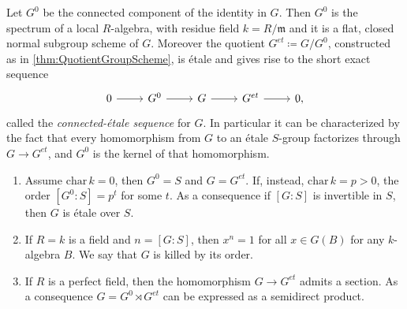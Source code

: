 \documentclass[../Main]{subfiles}
\begin{document}
\begin{thm}
	Let $G^0$ be the connected component of the identity in $G$.
	Then $G^0$ is the spectrum of a local $R$-algebra, with residue field $k = R/\mathfrak{m}$
	and it is a flat, closed normal subgroup scheme of $G$.
	Moreover the quotient $G^{et} \coloneqq G/G^0$,
	constructed as in \cref{thm:QuotientGroupScheme},
	is étale and gives rise to the short exact sequence
	\begin{equation*}
	\begin{tikzcd}
		0 \arrow[r, "", rightarrow] &
		G^0 \arrow[r, "", rightarrow] &
		G \arrow[r, "", rightarrow] &
		G^{et} \arrow[r, "", rightarrow] &
		0
	,\end{tikzcd}
	\end{equation*}
	called the {\em connected-étale sequence} for $G$.
	In particular it can be characterized by the fact that every homomorphism
	from $G$ to an étale $S$-group factorizes through $G \to G^{et}$,
	and $G^0$ is the kernel of that homomorphism.
\end{thm}


\begin{prop}\leavevmode\vspace{-.2\baselineskip}
\begin{enumerate}
	\item Assume $\mathrm{char}\, k = 0$, then $G^0 = S$
		and $G = G^{et}$.
		If, instead, $\mathrm{char}\, k = p > 0$, the order
		$[G^0:S] = p^t$ for some $t$.
		As a consequence if $[G:S]$ is invertible in $S$, then
		$G$ is étale over $S$.

	\item If $R = k$ is a field and $n = [G:S]$, then $x^n = 1$
		for all $x \in G(B)$ for any $k$-algebra $B$.
		We say that $G$ is killed by its order.

	\item If $R$ is a perfect field, then the homomorphism
		$G \to  G^{et}$ admits a section. 
		As a consequence $G = G^0 \rtimes G^{et}$
		can be expressed as a semidirect product.
\end{enumerate}
\end{prop}
\end{document}
